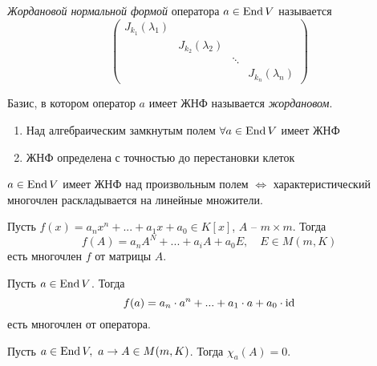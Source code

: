 \begin{Def}
	\textit{Жордановой нормальной формой}  оператора $a \in \operatorname{End} V$ называется 
	\[\left(\begin{array}{cccc}
		J_{k_1}(\lambda_1) &  &  & \\
		 & J_{k_2}(\lambda_2) &  &\\
		 & & \ddots &\\
		 & & & J_{k_n}(\lambda_n)
	\end{array}\right)\]
\end{Def} 

\begin{Def}
	Базис, в котором оператор $a$ имеет ЖНФ называется \textit{жордановом}. 
\end{Def} 

\begin{Thm}[ЖНФ] 
	\begin{enumerate}
		\item Над алгебраическим замкнутым полем $\forall a \in \operatorname{End} V$ имеет ЖНФ
		\item ЖНФ определена с точностью до перестановки клеток
	\end{enumerate}
\end{Thm} 

\begin{Thm} 
	$a \in \operatorname{End} V$ имеет ЖНФ над произвольным полем $\Leftrightarrow$ характеристический многочлен раскладывается на линейные множители.
\end{Thm} 


\begin{Def} 
	Пусть $f(x) = a_nx^n+...+a_1x+a_0 \in K[x]$, $A$ -- $m \times m$. Тогда
	\[f(A) = a_n A^N + ... + a_i A + a_0 E, \quad E \in M(m, K)\] 
	есть многочлен $f$ от матрицы $A$.
\end{Def} 

\begin{Def} 
	Пусть $a \in \operatorname{End} V$. Тогда
	\[f(a) = a_n \cdot a^n + ... + a_1 \cdot a + a_0 \cdot \operatorname{id}\] 
	есть многочлен от оператора.
\end{Def} 

\begin{Thm} 
	Пусть $a \in \operatorname{End} V, \ a \to A \in M(m, K)$. Тогда $\chi_a(A) = 0$. 
\end{Thm} 

